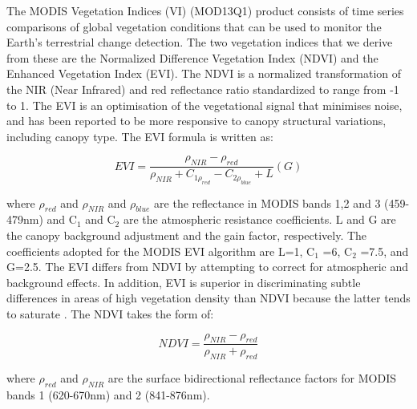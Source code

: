 The MODIS Vegetation Indices (VI) (MOD13Q1) product consists of time series comparisons of global vegetation conditions that can be used to monitor the Earth's terrestrial change detection. The two vegetation indices that we derive from these are the Normalized Difference Vegetation Index (NDVI) and the Enhanced Vegetation Index (EVI). The NDVI is a normalized transformation of the NIR (Near Infrared) and red reflectance ratio standardized to range from -1 to 1. The EVI is an optimisation of the vegetational signal that minimises noise, and has been reported to be more responsive to canopy structural variations, including canopy type. The EVI formula is written as: 

\setlength{\belowdisplayskip}{0pt} \setlength{\belowdisplayshortskip}{0pt}
\setlength{\abovedisplayskip}{0pt} \setlength{\abovedisplayshortskip}{0pt}

\begin{center}
\begin{equation}
EVI = \frac{\rho_{NIR} - \rho_{red}}{\rho_{NIR} + C_{1\rho_{red}} - C_{2\rho_{blue}} + L} (G) \label{eq:2} 
\end{equation}
\end{center}

where $\rho_{red}$ and $\rho_{NIR}$ and $\rho_{blue}$ are the reflectance in MODIS bands 1,2 and 3 (459-479nm) and C$_{1}$ and C$_{2}$ are the atmospheric resistance coefficients. L and G are the canopy background adjustment and the gain factor, respectively. The coefficients adopted for the MODIS EVI algorithm are L=1, C$_{1}$ =6, C$_{2}$ =7.5, and G=2.5. The EVI differs from NDVI by attempting to correct for atmospheric and background effects. In addition, EVI is superior in discriminating subtle differences in areas of high vegetation density than NDVI because the latter tends to saturate \citep{didan_munoz_2015, ratana_huete_ferreira_2005}. The NDVI takes the form of:


\begin{center}
\begin{equation}
NDVI = \frac{\rho_{NIR} - \rho_{red}}{\rho_{NIR} + \rho_{red}} \label{eq:1} 
\end{equation}
\end{center}

where $\rho_{red}$ and $\rho_{NIR}$ are the surface bidirectional reflectance factors for MODIS bands 1 (620-670nm) and 2 (841-876nm). 

